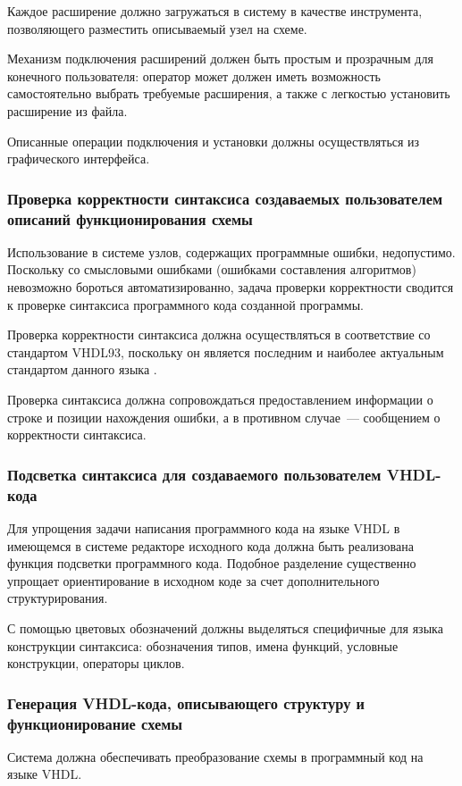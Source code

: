 Каждое расширение должно загружаться в систему в качестве инструмента, позволяющего разместить описываемый узел на схеме.

Механизм подключения расширений должен быть простым и прозрачным для конечного пользователя: оператор может должен иметь возможность самостоятельно выбрать требуемые расширения, а также с легкостью установить расширение из файла.

Описанные операции подключения и установки должны осуществляться из графического интерфейса.
%
%
\subsubsection{Проверка корректности синтаксиса создаваемых пользователем описаний функционирования схемы}
Использование в системе узлов, содержащих программные ошибки, недопустимо.
Поскольку со смысловыми ошибками (ошибками составления алгоритмов) невозможно бороться автоматизированно, задача проверки корректности сводится к проверке синтаксиса программного кода созданной программы.

Проверка корректности синтаксиса должна осуществляться в соответствие со стандартом VHDL93, поскольку он является последним и наиболее актуальным стандартом данного языка \cite{bibilo}.

Проверка синтаксиса должна сопровождаться предоставлением информации о строке и позиции нахождения ошибки, а в противном случае~--- сообщением о корректности синтаксиса.
%
%
\subsubsection{Подсветка синтаксиса для создаваемого пользователем VHDL-кода}
Для упрощения задачи написания программного кода на языке VHDL в имеющемся в системе редакторе исходного кода должна быть реализована функция подсветки программного кода.
Подобное разделение существенно упрощает ориентирование в исходном коде за счет дополнительного структурирования.

С помощью цветовых обозначений должны выделяться специфичные для языка конструкции синтаксиса: обозначения типов, имена функций, условные конструкции, операторы циклов.
%
%
\subsubsection{Генерация VHDL-кода, описывающего структуру и функционирование схемы}
Система должна обеспечивать преобразование схемы в программный код на языке VHDL.

